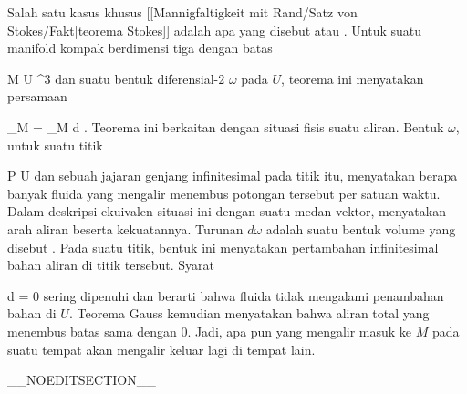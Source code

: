 {

Salah satu kasus khusus
[[Mannigfaltigkeit mit Rand/Satz von Stokes/Fakt|teorema Stokes]]
adalah apa yang disebut  {} atau  {.} Untuk suatu manifold kompak berdimensi tiga dengan batas

\mavergleichskette
{\vergleichskette
{ M
}
{ \subset }{ U
}
{ \subseteq }{ \R^3
}
{    }{
}
{   }{
}
}
{}{}{}
 {} {}
dan suatu bentuk diferensial-$2$ $\omega$ pada $U$, teorema ini menyatakan persamaan

\mavergleichskettedisp
{\vergleichskette
{ \int_{\partial M} \omega
}
{ =} { \int_M d \omega
}
{ } {
}
{ } {
}
{ } {
}
}
{}{}{.}
Teorema ini berkaitan dengan situasi fisis suatu aliran. Bentuk $\omega$, untuk suatu titik

\mavergleichskette
{\vergleichskette
{ P
}
{ \in }{ U
}
{  }{
}
{    }{
}
{   }{
}
}
{}{}{}
dan sebuah jajaran genjang infinitesimal pada titik itu, menyatakan berapa banyak fluida yang mengalir menembus potongan tersebut per satuan waktu. Dalam deskripsi ekuivalen situasi ini dengan suatu medan vektor,
 menyatakan arah aliran beserta kekuatannya. Turunan $d \omega$ adalah suatu bentuk volume yang disebut  {.} Pada suatu titik, bentuk ini menyatakan pertambahan infinitesimal bahan aliran
 {} {}
di titik tersebut. Syarat

\mavergleichskette
{\vergleichskette
{d \omega
}
{ = }{ 0
}
{  }{
}
{    }{
}
{   }{
}
}
{}{}{}
sering dipenuhi dan berarti bahwa fluida tidak mengalami penambahan bahan di $U$. Teorema Gauss kemudian menyatakan bahwa aliran total yang menembus batas
 {} {}
sama dengan $0$. Jadi, apa pun yang mengalir masuk ke $M$ pada suatu tempat akan mengalir keluar lagi di tempat lain.

}


__NOEDITSECTION__

